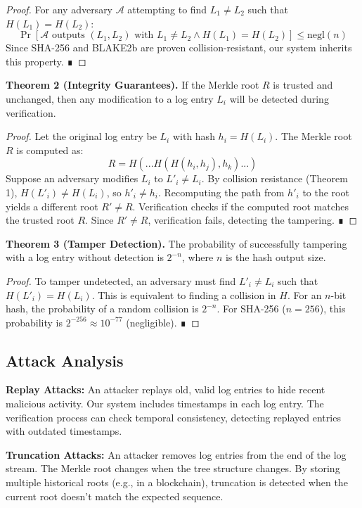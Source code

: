 \documentclass[a4paper,10pt]{article}
\begin{document}
\begin{proof}
For any adversary $\mathcal{A}$ attempting to find $L_1 \neq L_2$ such that $H(L_1) = H(L_2)$:
\[
\Pr[\mathcal{A} \text{ outputs } (L_1, L_2) \text{ with } L_1 \neq L_2 \wedge H(L_1) = H(L_2)] \leq \text{negl}(n)
\]
Since SHA-256 and BLAKE2b are proven collision-resistant, our system inherits this property. ∎
\end{proof}

\textbf{Theorem 2 (Integrity Guarantees).} If the Merkle root $R$ is trusted and unchanged, then any modification to a log entry $L_i$ will be detected during verification.

\begin{proof}
Let the original log entry be $L_i$ with hash $h_i = H(L_i)$. The Merkle root $R$ is computed as:
\[
R = H(...H(H(h_i, h_j), h_k)...)
\]
Suppose an adversary modifies $L_i$ to $L'_i \neq L_i$. By collision resistance (Theorem 1), $H(L'_i) \neq H(L_i)$, so $h'_i \neq h_i$. Recomputing the path from $h'_i$ to the root yields a different root $R' \neq R$. Verification checks if the computed root matches the trusted root $R$. Since $R' \neq R$, verification fails, detecting the tampering. ∎
\end{proof}

\textbf{Theorem 3 (Tamper Detection).} The probability of successfully tampering with a log entry without detection is $2^{-n}$, where $n$ is the hash output size.

\begin{proof}
To tamper undetected, an adversary must find $L'_i \neq L_i$ such that $H(L'_i) = H(L_i)$. This is equivalent to finding a collision in $H$. For an $n$-bit hash, the probability of a random collision is $2^{-n}$. For SHA-256 ($n=256$), this probability is $2^{-256} \approx 10^{-77}$ (negligible). ∎
\end{proof}

\subsection{Attack Analysis}

\textbf{Replay Attacks:} An attacker replays old, valid log entries to hide recent malicious activity. Our system includes timestamps in each log entry. The verification process can check temporal consistency, detecting replayed entries with outdated timestamps.

\textbf{Truncation Attacks:} An attacker removes log entries from the end of the log stream. The Merkle root changes when the tree structure changes. By storing multiple historical roots (e.g., in a blockchain), truncation is detected when the current root doesn't match the expected sequence.
\end{document}
